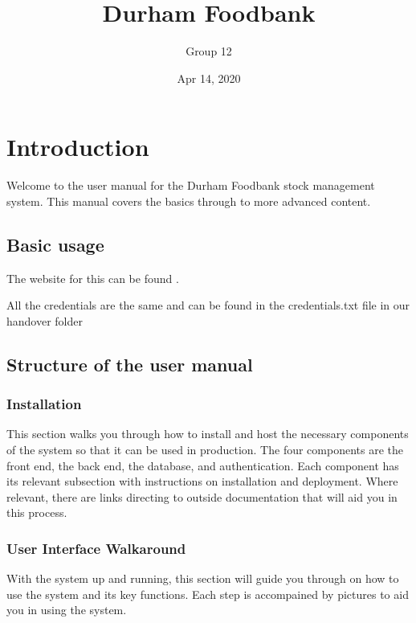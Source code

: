 \documentclass[letterpaper,10pt,english]{sphinxmanual}
\title{Durham Foodbank}
\date{Apr 14, 2020}
\author{Group 12}
\let\oldsubsection\subsection
\renewcommand{\subsection}{\needspace{6\baselineskip}\oldsubsection}
\begin{document}
\pagestyle{empty}
\sphinxmaketitle
\pagestyle{plain}
\sphinxtableofcontents
\pagestyle{normal}
\label{\detokenize{index::doc}}



\chapter{Introduction}
\label{\detokenize{index:introduction}}
Welcome to the user manual for the Durham Foodbank stock management
system. This manual covers the basics through to more advanced content.


\section{Basic usage}
\label{\detokenize{Introduction:basic-usage}}\label{\detokenize{Introduction::doc}}
The website for this can be found .

All the credentials are the same and can be found in the credentials.txt file in our handover folder


\section{Structure of the user manual}
\label{\detokenize{Introduction:structure-of-the-user-manual}}

\subsection{Installation}
\label{\detokenize{Introduction:installation}}
This section walks you through how to install and host the necessary
components of the system so that it can be used in production. The four
components are the front end, the back end, the database, and
authentication. Each component has its relevant subsection with
instructions on installation and deployment. Where relevant, there are
links directing to outside documentation that will aid you in this
process.


\subsection{User Interface Walkaround}
\label{\detokenize{Introduction:user-interface-walkaround}}
With the system up and running, this section will guide you through on
how to use the system and its key functions. Each step is accompained by
pictures to aid you in using the system.
\end{document}
